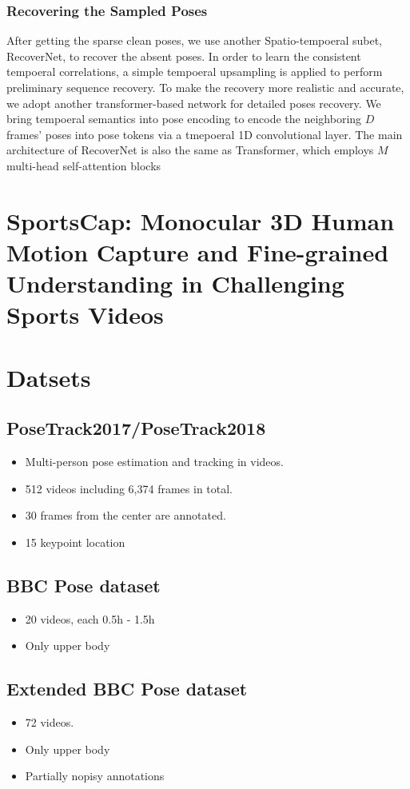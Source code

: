 \documentclass[a4paper]{report}
\begin{document}
\subsection*{Recovering the Sampled Poses}
After getting the sparse clean poses, we use another Spatio-tempoeral subet, RecoverNet, to recover the absent poses. In order to learn the consistent tempoeral correlations, a simple tempoeral upsampling is applied to perform preliminary sequence recovery. To make the recovery more realistic and accurate, we adopt another transformer-based network for detailed poses recovery. We bring tempoeral semantics into pose encoding to encode the neighboring $D$ frames' poses into pose tokens via a tmepoeral 1D convolutional layer. The main architecture of RecoverNet is also the same as Transformer, which employs $M$ multi-head self-attention blocks

\chapter*{SportsCap: Monocular 3D Human Motion Capture and Fine-grained Understanding in Challenging Sports Videos}


\chapter*{Datsets}
\section*{PoseTrack2017/PoseTrack2018}
\begin{itemize}
    \item Multi-person pose estimation and tracking in videos.
    \item 512 videos including 6,374 frames in total.
    \item 30 frames from the center are annotated.
    \item 15 keypoint location
\end{itemize}

\section*{BBC Pose dataset}
\begin{itemize}
    \item 20 videos, each 0.5h - 1.5h
    \item Only upper body
\end{itemize}

\section*{Extended BBC Pose dataset}
\begin{itemize}
    \item 72 videos. 
    \item Only upper body
    \item Partially nopisy annotations
\end{itemize}
\end{document}
